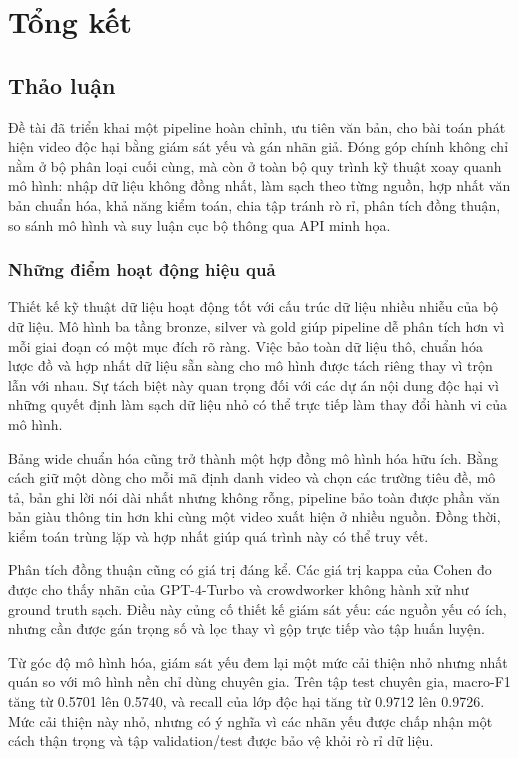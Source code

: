 \section{Tổng kết}

\subsection{Thảo luận}

Đề tài đã triển khai một pipeline hoàn chỉnh, ưu tiên văn bản, cho bài toán phát hiện video độc hại bằng giám sát yếu và gán nhãn giả. Đóng góp chính không chỉ nằm ở bộ phân loại cuối cùng, mà còn ở toàn bộ quy trình kỹ thuật xoay quanh mô hình: nhập dữ liệu không đồng nhất, làm sạch theo từng nguồn, hợp nhất văn bản chuẩn hóa, khả năng kiểm toán, chia tập tránh rò rỉ, phân tích đồng thuận, so sánh mô hình và suy luận cục bộ thông qua API minh họa.

\subsubsection{Những điểm hoạt động hiệu quả}

Thiết kế kỹ thuật dữ liệu hoạt động tốt với cấu trúc dữ liệu nhiều nhiễu của bộ dữ liệu. Mô hình ba tầng bronze, silver và gold giúp pipeline dễ phân tích hơn vì mỗi giai đoạn có một mục đích rõ ràng. Việc bảo toàn dữ liệu thô, chuẩn hóa lược đồ và hợp nhất dữ liệu sẵn sàng cho mô hình được tách riêng thay vì trộn lẫn với nhau. Sự tách biệt này quan trọng đối với các dự án nội dung độc hại vì những quyết định làm sạch dữ liệu nhỏ có thể trực tiếp làm thay đổi hành vi của mô hình.

Bảng wide chuẩn hóa cũng trở thành một hợp đồng mô hình hóa hữu ích. Bằng cách giữ một dòng cho mỗi mã định danh video và chọn các trường tiêu đề, mô tả, bản ghi lời nói dài nhất nhưng không rỗng, pipeline bảo toàn được phần văn bản giàu thông tin hơn khi cùng một video xuất hiện ở nhiều nguồn. Đồng thời, kiểm toán trùng lặp và hợp nhất giúp quá trình này có thể truy vết.

Phân tích đồng thuận cũng có giá trị đáng kể. Các giá trị kappa của Cohen đo được cho thấy nhãn của GPT-4-Turbo và crowdworker không hành xử như ground truth sạch. Điều này củng cố thiết kế giám sát yếu: các nguồn yếu có ích, nhưng cần được gán trọng số và lọc thay vì gộp trực tiếp vào tập huấn luyện.

Từ góc độ mô hình hóa, giám sát yếu đem lại một mức cải thiện nhỏ nhưng nhất quán so với mô hình nền chỉ dùng chuyên gia. Trên tập test chuyên gia, macro-F1 tăng từ 0.5701 lên 0.5740, và recall của lớp độc hại tăng từ 0.9712 lên 0.9726. Mức cải thiện này nhỏ, nhưng có ý nghĩa vì các nhãn yếu được chấp nhận một cách thận trọng và tập validation/test được bảo vệ khỏi rò rỉ dữ liệu.

